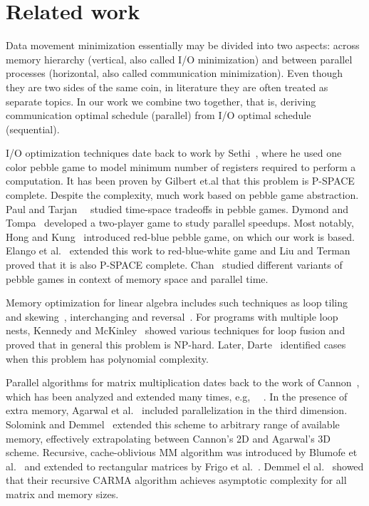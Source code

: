 \documentclass[sigplan,review,anonymous]{acmart}\settopmatter{printfolios=true,printccs=false,printacmref=false}
\begin{document}
\section{Related work}
Data movement minimization essentially may be divided into two aspects: across 
memory hierarchy (vertical, also called I/O minimization) and between parallel 
processes (horizontal, also called communication minimization). Even though 
they are two sides of the same coin, in literature they are often treated as 
separate topics. In our work we combine two together, that is, deriving 
communication optimal schedule (parallel) from I/O optimal schedule 
(sequential).

I/O optimization techniques date back to work by 
Sethi~\cite{completeRegisterProblems}, where he used one color pebble game to 
model minimum number of registers required to perform a computation. It has 
been proven by Gilbert et.al \cite{pebblegameregister} that this problem is 
P-SPACE complete. Despite the complexity, much work based on pebble game 
abstraction. Paul and Tarjan~~\cite{pebbleTradeoffs} studied time-space 
tradeoffs in pebble games. Dymond and Tompa~\cite{dymond2playerpebblegame} 
developed a 
two-player game to study parallel speedups. Most notably, Hong and 
Kung~\cite{redblue} introduced red-blue pebble game, on which our work is 
based. Elango et al.~\cite{redbluewhite} extended this work to red-blue-white 
game and Liu and Terman~\cite{redblueHard} proved that it is also P-SPACE 
complete. Chan~\cite{justApebbleGame} studied different variants of pebble 
games in context of memory space and parallel time.

Memory optimization for linear algebra includes such techniques as loop tiling 
and skewing~\cite{tiling}, interchanging and reversal~\cite{tiling2}. For 
programs with multiple loop nests, Kennedy and McKinley~\cite{loopFusion} 
showed various techniques for loop fusion and proved that in general this 
problem is NP-hard. Later, 
Darte~\cite{loopFusionComplexity} identified cases when this problem has 
polynomial complexity.

Parallel algorithms for matrix multiplication dates back to the work of 
Cannon~\cite{Cannon}, which has been analyzed and extended many times, e.g, 
~\cite{MManalysis}~\cite{generalCannon}. In the presence of extra memory, 
Agarwal et al.~\cite{summa3d} included parallelization in the third dimension. 
Solomink and Demmel~\cite{25d} extended this scheme to arbitrary range of 
available memory, effectively extrapolating between Cannon's 2D and Agarwal's 
3D scheme. Recursive, cache-oblivious MM algorithm was introduced by Blumofe 
et al.~\cite{recursiveMM} and extended to rectangular matrices by Frigo et 
al.~\cite{recursiveRectangularMM}. Demmel el al.~\cite{CARMA} showed that their 
recursive CARMA algorithm achieves asymptotic complexity for all matrix and 
memory sizes. 
\end{document}

